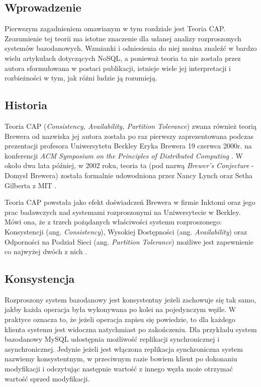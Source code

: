 \subsection*{Wprowadzenie}

Pierwszym zagadnieniem omawianym w tym rozdziale jest Teoria CAP.
Zrozumienie tej teorii ma istotne znaczenie dla udanej analizy rozproszonych systemów bazodanowych.
Wzmianki i odniesienia do niej można znaleźć w bardzo wielu artykułach dotyczących NoSQL, a ponieważ teoria ta nie została przez autora sformułowana w postaci publikacji, istnieje wiele jej interpretacji i rozbieżności w tym, jak różni ludzie ją rozumieją.

\subsection*{Historia}

Teoria CAP (\emph{Consistency, Availability, Partition Tolerance}) zwana również teorią Brewera od nazwiska jej autora została po raz pierwszy zaprezentowana podczas prezentacji profesora Uniwersytetu Berkley Eryka Brewera 19 czerwca 2000r. na konferencji \emph{ACM Symposium on the Principles of Distributed Computing} \cite{podc-keynote}. 
W około dwa lata później, w 2002 roku, teoria ta (pod nazwą \emph{Brewer's Conjecture} - Domysł Brewera) została formalnie udowodniona przez Nancy Lynch oraz Setha Gilberta z MIT \cite{brewers-conjecture}.

Teoria CAP powstała jako efekt doświadczeń Brewera w firmie Inktomi oraz jego prac badawczych nad systemami rozproszonymi na Uniwersytecie w Berkley. 
Mówi ona, że z trzech pożądanych właściwości systemu rozproszonego: Konsystencji (ang. \emph{Consistency}), Wysokiej Dostępności (ang. \emph{Availability}) oraz Odporności na Podział Sieci (ang. \emph{Partition Tolerance}) możliwe jest zapewnienie co najwyżej dwóch z nich \cite{browne-cap-theorem}.

\subsection*{Konsystencja}

Rozproszony system bazodanowy jest konsystentny jeżeli zachowuje się tak samo, jakby każda operacja była wykonywana po kolei na pojedynczym węźle.
W praktyce oznacza to, że jeżeli operacja zapisu się powiedzie, to dla każdego klienta systemu jest widoczna natychmiast po zakończeniu.
Dla przykładu system bazodanowy MySQL udostępnia możliwość replikacji synchronicznej i asynchronicznej.
Jedynie jeżeli jest włączona replikacja synchroniczna system nazwiemy konsystentnym, w przeciwnym razie bowiem klient po dokonaniu modyfikacji i odczytując następnie wartość z innego węzła może otrzymać wartość sprzed modyfikacji.
 
